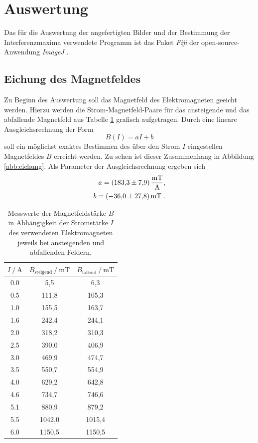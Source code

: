 \section{Auswertung}
Das für die Auswertung der angefertigten Bilder und der Bestimmung der Interferenzmaxima verwendete Programm ist das Paket \textit{Fiji} der open-source-Anwendung \textit{ImageJ} \cite{Fiji}.

\subsection{Eichung des Magnetfeldes}
Zu Beginn des Auswertung soll das Magnetfeld des Elektromagneten geeicht werden. Hierzu werden die Strom-Magnetfeld-Paare für das ansteigende und das abfallende Magnetfeld aus Tabelle \ref{tab:eichen} grafisch aufgetragen.
Durch eine lineare Ausgleichsrechnung der Form
\begin{equation}
  B(I)=aI+b
\end{equation}
soll ein möglichst exaktes Bestimmen des über den Strom $I$ eingestellen Magnetfeldes $B$ erreicht werden.
Zu sehen ist dieser Zusammenhang in Abbildung \ref{abb:eichung}.
Als Parameter der Ausgleichsrechnung ergeben sich
\begin{align*}
  a = \SI{183,3 \pm 7,9}{\milli\tesla\per\ampere},\\
    b = \SI{-36,0 \pm 27,8}{\milli\tesla}\;.
\end{align*}

\begin{table}[H]
  \centering
  \caption{Messwerte der Magnetfeldstärke $B$ in Abhängigkeit der Stromstärke $I$ des verwendeten Elektromagneten jeweils bei ansteigenden und abfallenden Feldern.}
  \label{tab:eichen}
  \begin{tabular}{c|cc}
    \toprule
    {$I \:/\: \si{\ampere}$} & {$B_\text{steigend} \:/\: \si{\milli\tesla}$} & {$B_\text{fallend} \:/\: \si{\milli\tesla}$} \\
    \midrule
  0.0    &     5,5  &    6,3  \\
  0.5    &    111,8  &   105,3  \\
  1.0    &   155,5  &  163,7  \\
  1.6    &   242,4  &  244,1  \\
  2.0    &   318,2  &  310,3  \\
  2.5    &   390,0  &  406,9  \\
  3.0    &   469,9  &  474,7  \\
  3.5    &   550,7  &  554,9  \\
  4.0    &   629,2  &  642,8  \\
  4.6    &   734,7  &  746,6  \\
  5.1    &   880,9  &  879,2  \\
  5.5    &   1042,0  &  1015,4  \\
  6.0    &   1150,5  &  1150,5  \\
  \end{tabular}
\end{table}


